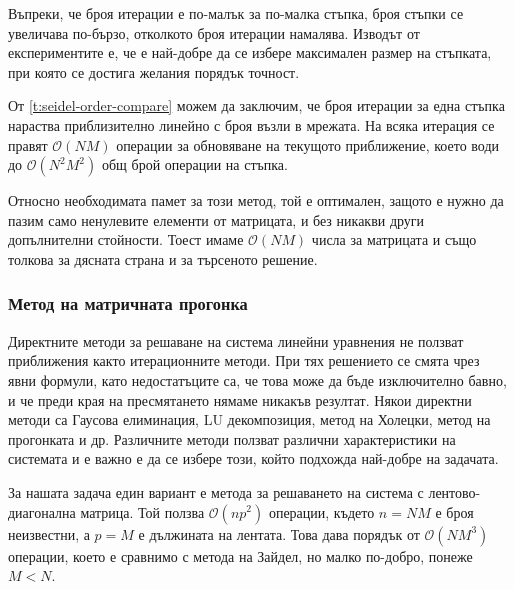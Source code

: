 \documentclass[12pt]{article}
\numberwithin{equation}{section}
\begin{document}
Въпреки, че броя итерации е по-малък за по-малка стъпка, броя стъпки се увеличава по-бързо, отколкото броя итерации намалява. Изводът от експериментите е, че е най-добре да се избере максимален размер на стъпката, при която се достига желания порядък точност.

От \autoref{t:seidel-order-compare} можем да заключим, че броя итерации за една стъпка нараства приблизително линейно с броя възли в мрежата. На всяка итерация се правят $\mathcal{O}(NM)$ операции за обновяване на текущото приближение, което води до $\mathcal{O}(N^2 M^2)$ общ брой операции на стъпка.

Относно необходимата памет за този метод, той е оптимален, защото е нужно да пазим само ненулевите елементи от матрицата, и без никакви други допълнителни стойности. Тоест имаме $\mathcal{O}(NM)$ числа за матрицата и също толкова за дясната страна и за търсеното решение.

\subsubsection{Метод на матричната прогонка}
Директните методи за решаване на система линейни уравнения не ползват приближения както итерационните методи. При тях решението се смята чрез явни формули, като недостатъците са, че това може да бъде изключително бавно, и че преди края на пресмятането нямаме никакъв резултат. Някои директни методи са Гаусова елиминация, LU декомпозиция, метод на Холецки, метод на прогонката и др. Различните методи ползват различни характеристики на системата и е важно е да се избере този, който подхожда най-добре на задачата.

За нашата задача един вариант е метода за решаването на система с лентово-диагонална матрица. Той ползва $\mathcal{O}(np^2)$ операции\cite{band-matrix}, където $n=NM$ е броя неизвестни, а $p=M$ е дължината на лентата. Това дава порядък от $\mathcal{O}(NM^3)$ операции, което е сравнимо с метода на Зайдел, но малко по-добро, понеже $M<N$.
\end{document}
